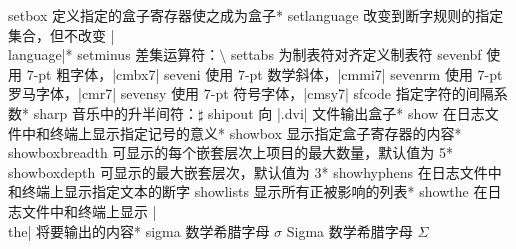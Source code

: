 \capcs setbox {定义指定的盒子寄存器使之成为盒子}*{}
\capcs setlanguage {改变到断字规则的指定集合，但不改变 |\\language|}{*}{}
\capcs setminus {差集运算符：$\setminus$}{}{}
\capcs settabs {为制表符对齐定义制表符}{}{}
\capcs sevenbf {使用 $7$-pt 粗字体，|cmbx7|}{}{}
\capcs seveni {使用 $7$-pt 数学斜体，|cmmi7|}{}{}
\capcs sevenrm {使用 $7$-pt 罗马字体，|cmr7|}{}{}
\capcs sevensy {使用 $7$-pt 符号字体，|cmsy7|}{}{}
\capcs sfcode {指定字符的间隔系数}*{}
\capcs sharp {音乐中的升半间符：$\sharp$}{}{}
\capcs shipout {向 |.dvi| 文件输出盒子}*{}
\capcs show {在日志文件中和终端上显示指定记号的意义}*{}
\capcs showbox {显示指定盒子寄存器的内容}*{}
\capcs showboxbreadth {可显示的每个嵌套层次上项目的最大数量，默认值为 5}*{}
\capcs showboxdepth {可显示的最大嵌套层次，默认值为 3}*{}
\capcs showhyphens {在日志文件中和终端上显示指定文本的断字}{}{}
\capcs showlists {显示所有正被影响的列表}*{}
\capcs showthe {在日志文件中和终端上显示 |\\the| 将要输出的内容}*{}
\capcs sigma {数学希腊字母 $\sigma$}{}{}
\capcs Sigma {数学希腊字母 $\Sigma$}{}{}
